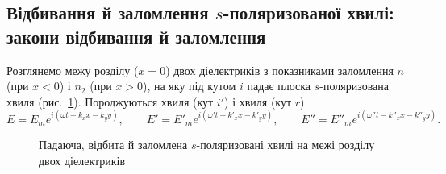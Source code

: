 \subsection*{Відбивання й заломлення $s$-поляризованої хвилі: закони відбивання й заломлення}

Розглянемо межу розділу ($x=0$) двох діелектриків з показниками заломлення $n_1$ (при $x<0$) і $n_2$ (при $x>0$), на яку під кутом $i$ падає
плоска $s$-поляризована хвиля (рис.~\ref{pic:SPolarization}). Породжуються  хвиля (кут $i'$) і  хвиля (кут $r$):
\begin{equation*}
	E = E_m e^{i(\omega t - k_xx-k_yy)}, \qquad E' = E'_m e^{i(\omega' t-k'_xx-k'_yy)}, \qquad E'' = E''_m e^{i(\omega''t-k''_xx-k''_yy)}.
\end{equation*}

\begin{figure}\centering
	\caption{Падаюча, відбита й заломлена $s$-поляризовані хвилі на межі розділу двох
		діелектриків\label{pic:SPolarization}}
\end{figure}

